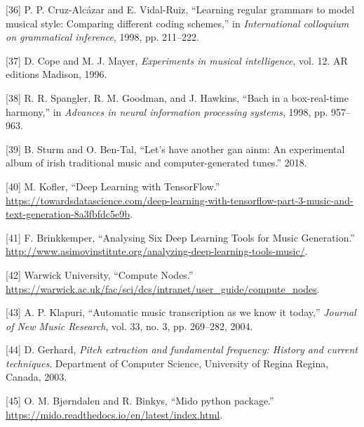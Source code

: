 \documentclass[12pt,]{article}
\begin{document}
\leavevmode\hypertarget{ref-cruz1998learning}{}%
{[}36{]} P. P. Cruz-Alcázar and E. Vidal-Ruiz, ``Learning regular
grammars to model musical style: Comparing different coding schemes,''
in \emph{International colloquium on grammatical inference}, 1998, pp.
211--222.

\leavevmode\hypertarget{ref-cope1996experiments}{}%
{[}37{]} D. Cope and M. J. Mayer, \emph{Experiments in musical
intelligence}, vol. 12. AR editions Madison, 1996.

\leavevmode\hypertarget{ref-spangler1998bach}{}%
{[}38{]} R. R. Spangler, R. M. Goodman, and J. Hawkins, ``Bach in a
box-real-time harmony,'' in \emph{Advances in neural information
processing systems}, 1998, pp. 957--963.

\leavevmode\hypertarget{ref-sturm2018let}{}%
{[}39{]} B. Sturm and O. Ben-Tal, ``Let's have another gan ainm: An
experimental album of irish traditional music and computer-generated
tunes.'' 2018.

\leavevmode\hypertarget{ref-mkofler}{}%
{[}40{]} M. Kofler, ``Deep Learning with TensorFlow.'' \\
\url{https://towardsdatascience.com/deep-learning-with-tensorflow-part-3-music-and-text-generation-8a3fbfdc5e9b}.

\leavevmode\hypertarget{ref-asimovinst}{}%
{[}41{]} F. Brinkkemper, ``Analysing Six Deep Learning Tools for Music
Generation.'' \\
\url{http://www.asimovinstitute.org/analyzing-deep-learning-tools-music/}.

\leavevmode\hypertarget{ref-warwickcomputenodes}{}%
{[}42{]} \relax Warwick University, ``Compute Nodes.'' \\
\url{https://warwick.ac.uk/fac/sci/dcs/intranet/user_guide/compute_nodes}.

\leavevmode\hypertarget{ref-klapuri2004automatic}{}%
{[}43{]} A. P. Klapuri, ``Automatic music transcription as we know it
today,'' \emph{Journal of New Music Research}, vol. 33, no. 3, pp.
269--282, 2004.

\leavevmode\hypertarget{ref-gerhard2003pitch}{}%
{[}44{]} D. Gerhard, \emph{Pitch extraction and fundamental frequency:
History and current techniques}. Department of Computer Science,
University of Regina Regina, Canada, 2003.

\leavevmode\hypertarget{ref-mido}{}%
{[}45{]} O. M. Bjørndalen and R. Binkys, ``Mido python package.'' \\
\url{https://mido.readthedocs.io/en/latest/index.html}.
\end{document}
